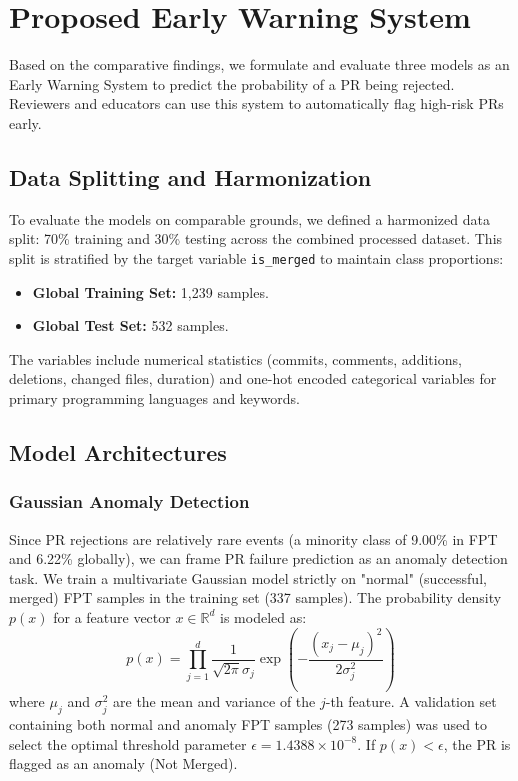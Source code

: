 \documentclass[conference]{IEEEtran}
\begin{document}
\section{Proposed Early Warning System}
Based on the comparative findings, we formulate and evaluate three models as an Early Warning System to predict the probability of a PR being rejected. Reviewers and educators can use this system to automatically flag high-risk PRs early.

\subsection{Data Splitting and Harmonization}
To evaluate the models on comparable grounds, we defined a harmonized data split: 70\% training and 30\% testing across the combined processed dataset. This split is stratified by the target variable \texttt{is\_merged} to maintain class proportions:
\begin{itemize}
  \item \textbf{Global Training Set:} 1,239 samples.
  \item \textbf{Global Test Set:} 532 samples.
\end{itemize}
The variables include numerical statistics (commits, comments, additions, deletions, changed files, duration) and one-hot encoded categorical variables for primary programming languages and keywords.

\subsection{Model Architectures}

\subsubsection{Gaussian Anomaly Detection}
Since PR rejections are relatively rare events (a minority class of 9.00\% in FPT and 6.22\% globally), we can frame PR failure prediction as an anomaly detection task. We train a multivariate Gaussian model strictly on "normal" (successful, merged) FPT samples in the training set (337 samples). The probability density $p(x)$ for a feature vector $x \in \mathbb{R}^d$ is modeled as:
\begin{equation}
p(x) = \prod_{j=1}^{d} \frac{1}{\sqrt{2\pi}\sigma_j} \exp\left(-\frac{(x_j - \mu_j)^2}{2\sigma_j^2}\right)
\end{equation}
where $\mu_j$ and $\sigma_j^2$ are the mean and variance of the $j$-th feature. A validation set containing both normal and anomaly FPT samples (273 samples) was used to select the optimal threshold parameter $\epsilon = 1.4388 \times 10^{-8}$. If $p(x) < \epsilon$, the PR is flagged as an anomaly (Not Merged).
\end{document}

